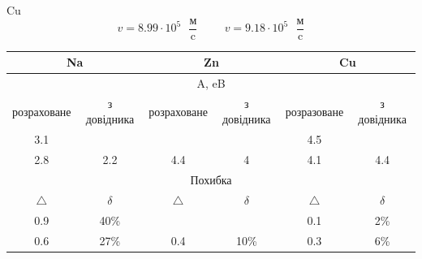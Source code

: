 \documentclass[a4paper,14pt]{extreport}
\begin{document}
	\begin{mybox1}[colback=lightmauve]{Cu}
		$$v =  8.99\cdot 10^{5} \text{ }\dfrac{\text{м}}{\text{c}} \hspace{1cm} v = 9.18\cdot 10^{5}  \text{ }\dfrac{\text{м}}{\text{c}}$$
	\end{mybox1}
	\newpage
	\begin{center}
	\end{center}

	\begin{table}[h]
	\begin{center}
		\begin{small}
		\begin{tabular}{|c|c|c|c|c|c|}
		\hline
		\multicolumn{2}{|c|}{\cellcolor[HTML]{FFCCC9}Na} & \multicolumn{2}{c|}{\cellcolor[HTML]{FFFFC7}Zn} & \multicolumn{2}{c|}{\cellcolor[HTML]{ECF4FF}Cu} \\ \hline
		\multicolumn{6}{|c|}{A, eB}                                                                                                                          \\ \hline
		розраховане        & з довідника\footnotemark                 & розраховане            & з довідника            & розразоване       & з довідника                 \\ \hline
		3.1                &                             &                        &                        & 4.5               &                             \\ \cline{1-1} \cline{5-5}
		2.8                & \multirow{-2}{*}{2.2}       & \multirow{-2}{*}{4.4}  & \multirow{-2}{*}{4}    & 4.1               & \multirow{-2}{*}{4.4}       \\ \hline
		\multicolumn{6}{|c|}{Похибка}                                                                                                                        \\ \hline
		$\triangle$        & $\delta$                    & $\triangle$            & $\delta$               & $\triangle$       & $\delta$                    \\ \hline
		0.9                & 40\%                        &                        &                        & 0.1               & 2\%                         \\ \cline{1-2} \cline{5-6} 
		0.6                & 27\%                        & \multirow{-2}{*}{0.4}  & \multirow{-2}{*}{10\%} & 0.3               & 6\%                         \\ \hline
		\end{tabular}
		\end{small}
		\end{center}
	\end{table}
\end{document}
